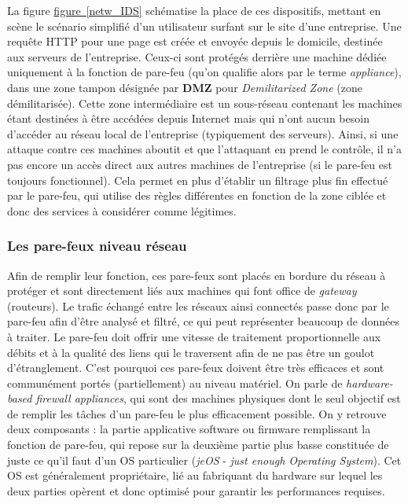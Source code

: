\documentclass[]{article}
\newcommand{\wordlink}[2]{\hyperref[#1]{#2~\ref{#1}}}
\begin{document}
\par La figure \wordlink{netw_IDS}{figure} schématise la place de ces dispositifs, mettant en scène le scénario simplifié d'un utilisateur surfant sur le site d'une entreprise. Une requête HTTP pour une page est créée et envoyée depuis le domicile, destinée aux serveurs de l'entreprise. Ceux-ci sont protégés derrière une machine dédiée uniquement à la fonction de pare-feu (qu'on qualifie alors par le terme \textit{appliance}), dans une zone tampon désignée par \textbf{DMZ} pour \textit{Demilitarized Zone} (zone démilitarisée). Cette zone intermédiaire est un sous-réseau contenant les machines étant destinées à être accédées depuis Internet mais qui n'ont aucun besoin d'accéder au réseau local de l'entreprise (typiquement des serveurs). Ainsi, si une attaque contre ces machines aboutit et que l'attaquant en prend le contrôle, il n'a pas encore un accès direct aux autres machines de l'entreprise (si le pare-feu est toujours fonctionnel). Cela permet en plus d'établir un filtrage plus fin effectué par le pare-feu, qui utilise des règles différentes en fonction de la zone ciblée et donc des services à considérer comme légitimes.

\subsubsection{Les pare-feux niveau réseau}\label{netw_fw}

\par Afin de remplir leur fonction, ces pare-feux sont placés en bordure du réseau à protéger et sont  directement liés aux machines qui font office de \textit{gateway} (routeurs). Le trafic échangé entre les réseaux ainsi connectés passe donc par le pare-feu afin d'être analysé et filtré, ce qui peut représenter beaucoup de données à traiter. Le pare-feu doit offrir une vitesse de traitement proportionnelle aux débits et à la qualité des liens qui le traversent afin de ne pas être un goulot d'étranglement. C'est pourquoi ces pare-feux doivent être très efficaces et sont communément portés (partiellement) au niveau matériel. On parle de \textit{hardware-based firewall appliances}, qui sont des machines physiques dont le seul objectif est de remplir les tâches d'un pare-feu le plus efficacement possible. On y retrouve deux composants : la partie applicative software ou firmware remplissant la fonction de pare-feu, qui repose sur la deuxième partie plus basse constituée de juste ce qu'il faut d'un OS particulier (\textit{jeOS} - \textit{just enough Operating System}). Cet OS est généralement propriétaire, lié au fabriquant du hardware sur lequel les deux parties opèrent et donc optimisé pour garantir les performances requises.\\
\end{document}
